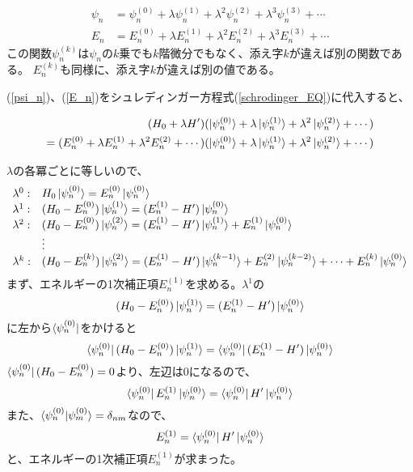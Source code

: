 \begin{align}
	\label{psi_n}
	\psi_{n} &= \psi_{n}^{(0)}+\lambda \psi_{n}^{(1)}+\lambda^{2}\psi_{n}^{(2)}+\lambda^{3} \psi_{n}^{(3)}+\cdots \\
	\label{E_n}
		 E_{n} &= E_{n}^{(0)}+\lambda E_{n}^{(1)}+\lambda^{2} E_{n}^{(2)}+\lambda^{3} E_{n}^{(3)}+\cdots
\end{align}
この関数$\psi_n^{(k)}$は$\psi_n$の$k$乗でも$k$階微分でもなく、添え字$k$が違えば別の関数である。
$E_n^{(k)}$も同様に、添え字$k$が違えば別の値である。

(\ref{psi_n})、(\ref{E_n})をシュレディンガー方程式(\ref{schrodinger_EQ})に代入すると、

\begin{equation}
	\begin{split}
		(H_0 + \lambda H')(\ket{\psi_n^{(0)}} + \lambda\ket{\psi_n^{(1)}} + \lambda^2\ket{\psi_n^{(2)}} + \cdots)\\
		= (E_n^{(0)} + \lambda E_n^{(1)} + \lambda^2E_n^{(2)} + \cdots )(\ket{\psi_n^{(0)}} + \lambda \ket{\psi_n^{(1)}} + \lambda^2\ket{\psi_n^{(2)}} + \cdots)
	\end{split}
\end{equation}

$\lambda$の各冪ごとに等しいので、
\begin{equation}
	\begin{array}{ll}
		\lambda^0: & H_0\ket{\psi_n^{(0)}} = E_n^{(0)}\ket{\psi_n^{(0)}} \\
		\lambda^1: & (H_0 - E_n^{(0)})\ket{\psi_n^{(1)}} = (E_n^{(1)} - H')\ket{\psi_n^{(0)}} \\
		\lambda^2: & (H_0 - E_n^{(0)})\ket{\psi_n^{(2)}} = (E_n^{(1)} - H')\ket{\psi_n^{(1)}} + E_n^{(1)}\ket{\psi_n^{(0)}} \\
		 					 & \vdots  \\
		\lambda^k: & (H_0 - E_n^{(k)})\ket{\psi_n^{(2)}} = (E_n^{(1)} - H')\ket{\psi_n^{(k-1)}} + E_n^{(2)}\ket{\psi_n^{(k-2)}} + \cdots + E_n^{(k)}\ket{\psi_n^{(0)}}
	\end{array}
\end{equation}
まず、エネルギーの1次補正項$E_n^{(1)}$を求める。$\lambda^1$の
\begin{equation}
	\label{lambda1}
	(H_0 - E_n^{(0)})\ket{\psi_n^{(1)}} = (E_n^{(1)} - H')\ket{\psi_n^{(0)}}
\end{equation}
に左から$\bra{\psi_n^{(0)}}$をかけると
\begin{equation}
	\bra{\psi_n^{(0)}}(H_0 - E_n^{(0)})\ket{\psi_n^{(1)}} = \bra{\psi_n^{(0)}}(E_n^{(1)} - H')\ket{\psi_n^{(0)}}
\end{equation}
$\bra{\psi_n^{(0)}}(H_0 - E_n^{(0)}) = 0$より、左辺は$0$になるので、
\begin{equation}
	\bra{\psi_n^{(0)}} E_n^{(1)} \ket{\psi_n^{(0)}} = \bra{\psi_n^{(0)}} H' \ket{\psi_n^{(0)}}
\end{equation}
また、$\braket{\psi_n^{(0)}|\psi_m^{(0)}} = \delta_{nm}$なので、
\begin{equation}
	\label{result_En}
	E_n^{(1)} = \bra{\psi_n^{(0)}} H' \ket{\psi_n^{(0)}}
\end{equation}
と、エネルギーの1次補正項$E_n^{(1)}$が求まった。

